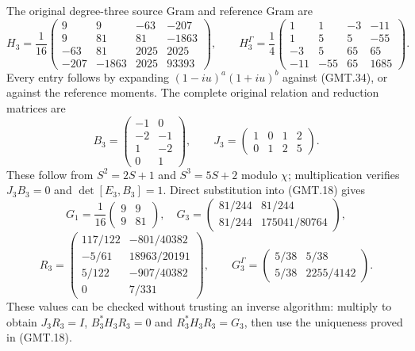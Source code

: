 The original degree-three source Gram and reference Gram are
\[
 H_3=\frac1{16}\begin{pmatrix}
 9&9&-63&-207\\9&81&81&-1863\\
 -63&81&2025&2025\\-207&-1863&2025&93393
 \end{pmatrix},\qquad
 H_3^\Gamma=\frac14\begin{pmatrix}
 1&1&-3&-11\\1&5&5&-55\\-3&5&65&65\\-11&-55&65&1685
 \end{pmatrix}.                                               \tag{GMT.35}
\]
Every entry follows by expanding $(1-iu)^a(1+iu)^b$ against
(GMT.34), or against the reference moments. The complete original
relation and reduction matrices are
\[
 B_3=\begin{pmatrix}-1&0\\-2&-1\\1&-2\\0&1\end{pmatrix},
 \qquad J_3=\begin{pmatrix}1&0&1&2\\0&1&2&5\end{pmatrix}.
                                                                    \tag{GMT.36}
\]
These follow from $S^2=2S+1$ and $S^3=5S+2$ modulo $\chi$;
multiplication verifies $J_3B_3=0$ and $\det[E_3,B_3]=1$.
Direct substitution into (GMT.18) gives
\[
 G_1=\frac1{16}\begin{pmatrix}9&9\\9&81\end{pmatrix},\quad
 G_3=\begin{pmatrix}81/244&81/244\\81/244&175041/80764\end{pmatrix},
\]
\[
 R_3=\begin{pmatrix}
 117/122&-801/40382\\-5/61&18963/20191\\
 5/122&-907/40382\\0&7/331
 \end{pmatrix},\qquad
 G_3^\Gamma=\begin{pmatrix}5/38&5/38\\5/38&2255/4142\end{pmatrix}.
                                                                    \tag{GMT.37}
\]
These values can be checked without trusting an inverse algorithm:
multiply to obtain $J_3R_3=I$, $B_3^*H_3R_3=0$ and
$R_3^*H_3R_3=G_3$, then use the uniqueness proved in (GMT.18).

